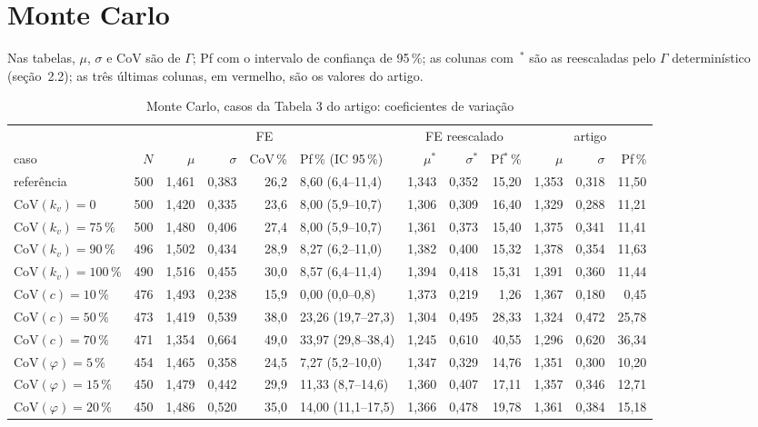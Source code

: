 \documentclass[11pt,a4paper]{article}
\newcommand{\Gam}{\Gamma}
\begin{document}
\section{Monte Carlo}
Nas tabelas, $\mu$, $\sigma$ e CoV são de $\Gam$; Pf com o intervalo de confiança de 95\,\%; as colunas com~$^*$ são as reescaladas pelo $\Gam$ determinístico (seção~2.2); as três últimas colunas, em vermelho, são os valores do artigo.
\begin{table}[H]\centering\footnotesize\setlength{\tabcolsep}{3.2pt}\caption{Monte Carlo, casos da Tabela 3 do artigo: coeficientes de variação}\label{tab:mc3}
\begin{tabular}{lrrrrlrrr>{\color{art}}r>{\color{art}}r>{\color{art}}r}\toprule & \multicolumn{5}{c}{FE} & \multicolumn{3}{c}{FE reescalado} & \multicolumn{3}{c}{\color{art}artigo}\\\cmidrule(lr){2-6}\cmidrule(lr){7-9}\cmidrule(l){10-12}caso & $N$ & $\mu$ & $\sigma$ & CoV\,\% & Pf\,\% (IC 95\,\%) & $\mu^*$ & $\sigma^*$ & Pf$^*$\,\% & $\mu$ & $\sigma$ & Pf\,\%\\\midrule
referência & 500 & 1{,}461 & 0{,}383 & 26{,}2 & 8{,}60 (6{,}4--11{,}4) & 1{,}343 & 0{,}352 & 15{,}20 & 1{,}353 & 0{,}318 & 11{,}50\\
$\mathrm{CoV}(k_v) = 0$ & 500 & 1{,}420 & 0{,}335 & 23{,}6 & 8{,}00 (5{,}9--10{,}7) & 1{,}306 & 0{,}309 & 16{,}40 & 1{,}329 & 0{,}288 & 11{,}21\\
$\mathrm{CoV}(k_v) = 75\,\%$ & 500 & 1{,}480 & 0{,}406 & 27{,}4 & 8{,}00 (5{,}9--10{,}7) & 1{,}361 & 0{,}373 & 15{,}40 & 1{,}375 & 0{,}341 & 11{,}41\\
$\mathrm{CoV}(k_v) = 90\,\%$ & 496 & 1{,}502 & 0{,}434 & 28{,}9 & 8{,}27 (6{,}2--11{,}0) & 1{,}382 & 0{,}400 & 15{,}32 & 1{,}378 & 0{,}354 & 11{,}63\\
$\mathrm{CoV}(k_v) = 100\,\%$ & 490 & 1{,}516 & 0{,}455 & 30{,}0 & 8{,}57 (6{,}4--11{,}4) & 1{,}394 & 0{,}418 & 15{,}31 & 1{,}391 & 0{,}360 & 11{,}44\\
$\mathrm{CoV}(c) = 10\,\%$ & 476 & 1{,}493 & 0{,}238 & 15{,}9 & 0{,}00 (0{,}0--0{,}8) & 1{,}373 & 0{,}219 & 1{,}26 & 1{,}367 & 0{,}180 & 0{,}45\\
$\mathrm{CoV}(c) = 50\,\%$ & 473 & 1{,}419 & 0{,}539 & 38{,}0 & 23{,}26 (19{,}7--27{,}3) & 1{,}304 & 0{,}495 & 28{,}33 & 1{,}324 & 0{,}472 & 25{,}78\\
$\mathrm{CoV}(c) = 70\,\%$ & 471 & 1{,}354 & 0{,}664 & 49{,}0 & 33{,}97 (29{,}8--38{,}4) & 1{,}245 & 0{,}610 & 40{,}55 & 1{,}296 & 0{,}620 & 36{,}34\\
$\mathrm{CoV}(\varphi) = 5\,\%$ & 454 & 1{,}465 & 0{,}358 & 24{,}5 & 7{,}27 (5{,}2--10{,}0) & 1{,}347 & 0{,}329 & 14{,}76 & 1{,}351 & 0{,}300 & 10{,}20\\
$\mathrm{CoV}(\varphi) = 15\,\%$ & 450 & 1{,}479 & 0{,}442 & 29{,}9 & 11{,}33 (8{,}7--14{,}6) & 1{,}360 & 0{,}407 & 17{,}11 & 1{,}357 & 0{,}346 & 12{,}71\\
$\mathrm{CoV}(\varphi) = 20\,\%$ & 450 & 1{,}486 & 0{,}520 & 35{,}0 & 14{,}00 (11{,}1--17{,}5) & 1{,}366 & 0{,}478 & 19{,}78 & 1{,}361 & 0{,}384 & 15{,}18\\
\bottomrule\end{tabular}
\end{table}
\end{document}
